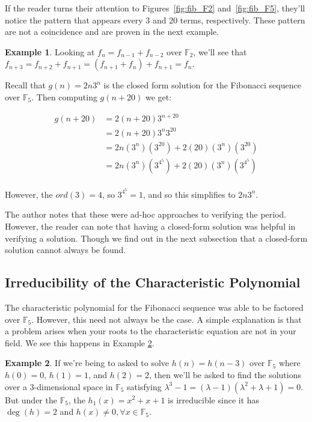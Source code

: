 \documentclass[a4paper]{article}
\theoremstyle{definition}
\newtheorem{example}{Example}[section]
\begin{document}
If the reader turns their attention to Figures~\ref{fig:fib_F2} and~\ref{fig:fib_F5}, they'll notice the
pattern that appears every 3 and 20 terms, respectively. These pattern are not a coincidence and are
proven in the next example.

\begin{example}
Looking at $f_n=f_{n-1}+f_{n-2}$ over $\mathbb{F}_2$, we'll see that
$f_{n+3}=f_{n+2}+f_{n+1}=(f_{n+1}+f_{n})+f_{n+1}=f_{n}$.

Recall that $g(n)=2n3^n$ is the closed form solution for the Fibonacci sequence over $\mathbb{F}_5$.
Then computing $g(n+20)$ we get:

\begin{align*}
g(n+20)
&=2(n+20)3^{n+20} \\
&=2(n+20)3^n3^{20} \\
&=2n(3^n)(3^{20})+2(20)(3^n)(3^{20}) \\
&=2n(3^n)(3^{4^{5}})+2(20)(3^n)(3^{4^{5}}) \\
\end{align*}

However, the $ord(3)=4$, so $3^{4^{5}}=1$, and so this simplifies to $2n3^n$. 
\label{ex:period_fib_F5}
\end{example}

The author notes that these were ad-hoc approaches to verifying the period. However, the reader can note
that having a closed-form solution was helpful in verifying a solution. Though we find out in the next
subsection that a closed-form solution cannot always be found.

\subsection{Irreducibility of the Characteristic Polynomial}

The characteristic polynomial for the Fibonacci sequence was able to be factored over $\mathbb{F}_5$.
However, this need not always be the case. A simple explanation is that a problem arises when your roots
to the characteristic equation are not in your field. We see this happens in Example
\ref{ex:cubic-irred}.

\begin{example}
If we're being to asked to solve $h(n)=h(n-3)$ over $\mathbb{F}_5$ where $h(0)=0$, $h(1)=1$, and $h(2)=2$,
then we'll be asked to find the solutions over a 3-dimensional space in $\mathbb{F}_5$ satisfying
$\lambda^{3}-1=(\lambda-1)(\lambda^2+\lambda+1)=0$. But under the $\mathbb{F}_5$, the $h_1(x)=x^2+x+1$ is
irreducible since it has $\deg(h)=2$ and $h(x)\ne 0, \forall x\in \mathbb{F}_5$. 
\label{ex:cubic-irred}
\end{example}
\end{document}
